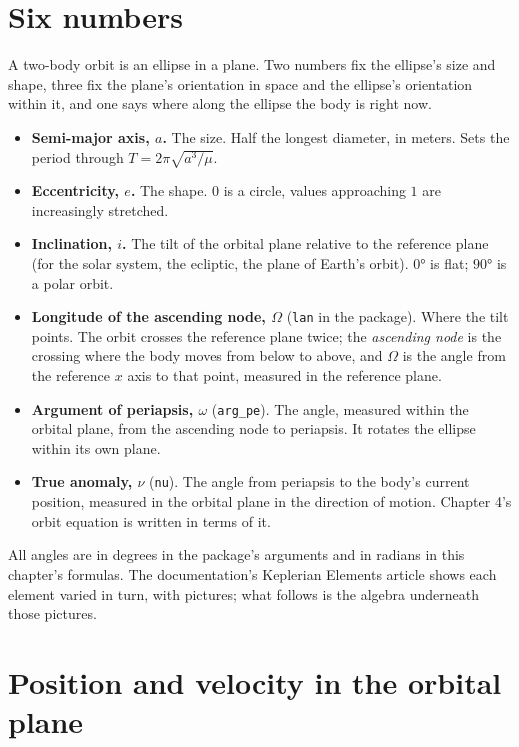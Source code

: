 \documentclass[
  10.5pt,
  letterpaper,
]{scrbook}
\providecommand{\tightlist}{%
  \setlength{\itemsep}{0pt}\setlength{\parskip}{0pt}}
\theoremstyle{definition}
\theoremstyle{plain}
\theoremstyle{remark}
\begin{document}
\section{Six numbers}\label{six-numbers}

A two-body orbit is an ellipse in a plane. Two numbers fix the ellipse's
size and shape, three fix the plane's orientation in space and the
ellipse's orientation within it, and one says where along the ellipse
the body is right now.

\begin{itemize}
\tightlist
\item
  \textbf{Semi-major axis, \(a\).} The size. Half the longest diameter,
  in meters. Sets the period through \(T = 2\pi\sqrt{a^3/\mu}\).
\item
  \textbf{Eccentricity, \(e\).} The shape. \(0\) is a circle, values
  approaching \(1\) are increasingly stretched.
\item
  \textbf{Inclination, \(i\).} The tilt of the orbital plane relative to
  the reference plane (for the solar system, the ecliptic, the plane of
  Earth's orbit). \(0°\) is flat; \(90°\) is a polar orbit.
\item
  \textbf{Longitude of the ascending node, \(\Omega\)} (\texttt{lan} in
  the package). Where the tilt points. The orbit crosses the reference
  plane twice; the \emph{ascending node} is the crossing where the body
  moves from below to above, and \(\Omega\) is the angle from the
  reference \(x\) axis to that point, measured in the reference plane.
\item
  \textbf{Argument of periapsis, \(\omega\)} (\texttt{arg\_pe}). The
  angle, measured within the orbital plane, from the ascending node to
  periapsis. It rotates the ellipse within its own plane.
\item
  \textbf{True anomaly, \(\nu\)} (\texttt{nu}). The angle from periapsis
  to the body's current position, measured in the orbital plane in the
  direction of motion. Chapter 4's orbit equation is written in terms of
  it.
\end{itemize}

All angles are in degrees in the package's arguments and in radians in
this chapter's formulas. The documentation's Keplerian Elements article
shows each element varied in turn, with pictures; what follows is the
algebra underneath those pictures.

\section{Position and velocity in the orbital
plane}\label{position-and-velocity-in-the-orbital-plane}
\end{document}
